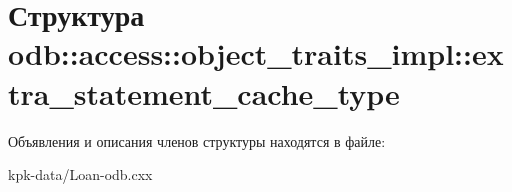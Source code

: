 \hypertarget{structodb_1_1access_1_1object__traits__impl_1_1extra__statement__cache__type}{}\section{Структура odb\+:\+:access\+:\+:object\+\_\+traits\+\_\+impl\+:\+:extra\+\_\+statement\+\_\+cache\+\_\+type}
\label{structodb_1_1access_1_1object__traits__impl_1_1extra__statement__cache__type}


Объявления и описания членов структуры находятся в файле\+:\begin{DoxyCompactItemize}
\item 
kpk-\/data/Loan-\/odb.\+cxx\end{DoxyCompactItemize}
